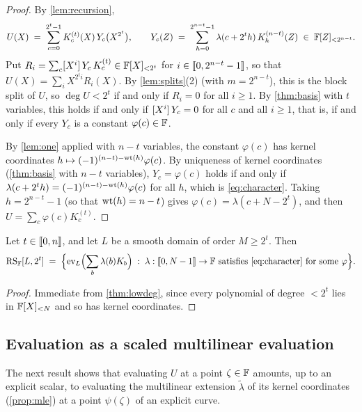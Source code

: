 \begin{proof}
By \cref{lem:recursion},
\[
  U(X) \;=\; \sum_{c=0}^{2^t-1} K^{(t)}_c(X)\, Y_c\bigl(X^{2^t}\bigr),
  \qquad
  Y_c(Z) \;=\; \sum_{h=0}^{2^{n-t}-1} \lambda(c+2^t h)\, K^{(n-t)}_h(Z) \;\in\; \mathbb{F}[Z]_{<2^{n-t}} .
\]
Put $R_i = \sum_c [X^{i}]\,Y_c\, K^{(t)}_c \in \mathbb{F}[X]_{<2^t}$ for $i \in \llbracket 0, 2^{n-t}-1 \rrbracket$, so that $U(X) = \sum_{i} X^{2^t i} R_i(X)$.
By \cref{lem:splits}(2) (with $m = 2^{n-t}$), this is the block split of $U$, so $\deg U < 2^t$ if and only if $R_i = 0$ for all $i \ge 1$.
By \cref{thm:basis} with $t$ variables, this holds if and only if $[X^{i}]\,Y_c = 0$ for all $c$ and all $i \ge 1$, that is, if and only if every $Y_c$ is a constant $\varphi(c) \in \mathbb{F}$.

By \cref{lem:one} applied with $n-t$ variables, the constant $\varphi(c)$ has kernel coordinates $h \mapsto (-1)^{(n-t)-\mathrm{wt}(h)} \varphi(c)$.
By uniqueness of kernel coordinates (\cref{thm:basis} with $n-t$ variables), $Y_c = \varphi(c)$ holds if and only if $\lambda(c+2^t h) = (-1)^{(n-t)-\mathrm{wt}(h)}\varphi(c)$ for all $h$, which is \eqref{eq:character}.
Taking $h = 2^{n-t}-1$ (so that $\mathrm{wt}(h) = n-t$) gives $\varphi(c) = \lambda(c + N-2^t)$, and then $U = \sum_c \varphi(c) K^{(t)}_c$.
\end{proof}

\begin{corollary}\label{cor:rs-kernel}
Let $t \in \llbracket 0, n \rrbracket$, and let $L$ be a smooth domain of order $M \ge 2^t$. Then
\[
  \mathrm{RS}_{\mathbb{F}}[L, 2^t] \;=\; \Bigl\{ \mathrm{ev}_L\Bigl(\sum_{b} \lambda(b) K_b\Bigr) \;:\; \lambda : \llbracket 0, N-1 \rrbracket \to \mathbb{F} \text{ satisfies \eqref{eq:character} for some } \varphi \Bigr\}.
\]
\end{corollary}

\begin{proof}
Immediate from \cref{thm:lowdeg}, since every polynomial of degree $< 2^t$ lies in $\mathbb{F}[X]_{<N}$ and so has kernel coordinates.
\end{proof}

\subsection{Evaluation as a scaled multilinear evaluation}\label{sec:kernel:eval}

The next result shows that evaluating $U$ at a point $\zeta \in \mathbb{F}$ amounts, up to an explicit scalar, to evaluating the multilinear extension $\tilde\lambda$ of its kernel coordinates (\cref{prop:mle}) at a point $\psi(\zeta)$ of an explicit curve.

